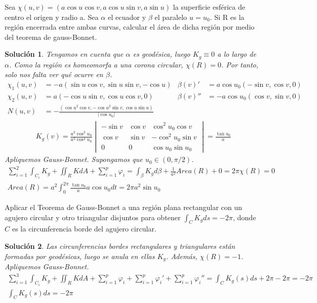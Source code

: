 \documentclass[twoside]{report}
\theoremstyle{plain}
\newtheorem*{sol*}{Solución}
\newcommand{\X}{\chi}
\newenvironment{ejercicio}[2][Estado]{\begin{trivlist}
\item[\hskip \labelsep {\bfseries Ejercicio}\hskip \labelsep {\bfseries #2.}]}{\end{trivlist}}
\begin{document}
\begin{ejercicio}{8} Sea $\X(u,v) = (a\cos{u}\cos{v},a\cos{u}\sin{v},a\sin{u})$ la superficie esférica de centro el origen y radio a. Sea $\alpha$ el ecuador y $\beta$ el paralelo $u=u_0$. Si R es la región encerrada entre ambas curvas, calcular el área de dicha región por medio del teorema de gauss-Bonnet.
\end{ejercicio}
\begin{sol*}
Tengamos en cuenta que $\alpha$ es geodésica, luego $K_g\equiv 0$ a lo largo de $\alpha$. Como la región es homeomorfa a una corona circular, $\chi(R)=0$. Por tanto, solo nos falta ver qué ocurre en $\beta$. 
\begin{align*}
\X_1(u,v) &= -a(\sin{u}\cos{v},\sin{u}\sin{v},-\cos{u}) &\beta(v)' &=a\cos{u_0}(-\sin{v}, \cos{v},0)\\
\X_2 (u,v)&=  a(-\cos{u}\sin{v}, \cos{u}\cos{v},0) & \beta(v)'' &=-a\cos{u_0}(\cos{v},\sin{v},0)\\
N(u,v)& = -\frac{(\cos{u}^2\cos{v},-\cos{u}^2\sin{v},\cos{u}\sin{u})}{|\cos u_0|}& &
\end{align*}
\begin{gather*}
K_g(v)=\frac{a^2\cos^2 u_0}{a^3\cos^4 u_0}
\begin{vmatrix}
-\sin v & \cos v & \cos^2 u_0 \cos v\\
 \cos v & \sin v & -\cos^2 u_0 \sin v\\
 0 		& 0		 & \cos u_0 \sin u_0
\end{vmatrix}
=
\frac{\tan u_0}{a}
\end{gather*}
Apliquemos Gauss-Bonnet. Supongamos que $u_0 \in (0,\pi/2)$.
\begin{gather*}
\sum_{i=1}^2 \int_{C_i}K_g + \iint_R KdA + \sum_{i=1}^p \varphi_i = \int_\beta K_g d\beta + \frac{1}{a^2}Area(R) + 0 = 2\pi \chi(R)=0\\
Area(R) = a^2 \int_{0}^{2\pi} \frac{\tan u_0}{a} a\cos{u_0} dt = 2\pi a^2 \sin u_0
\end{gather*}
\end{sol*}
\newpage


\begin{ejercicio}{9} Aplicar el Teorema de Gauss-Bonnet a una región plana rectangular con un agujero circular y otro triangular disjuntos para obtener $\int_C K_g ds = -2\pi$, donde $C$ es la circunferencia borde del agujero circular.
\end{ejercicio}
\begin{sol*}
Las circunferencias bordes rectangulares y triangulares están formadas por geodésicas, luego se anula en ellas $K_g$. Además, $\chi(R)=-1$. Apliquemos Gauss-Bonnet.
\begin{gather*}
\sum_{i=1}^3 \int_{C_i}K_g + \iint_R KdA + \sum_{i=1}^p \varphi_i +\sum_{i=1}^p \varphi_i' + \sum_{i=1}^p \varphi_i'' = \int_C K_g(s)ds + 2\pi - 2\pi = -2\pi\\
\int_C K_g(s)ds = -2\pi
\end{gather*}
\end{sol*}
\newpage
\end{document}
